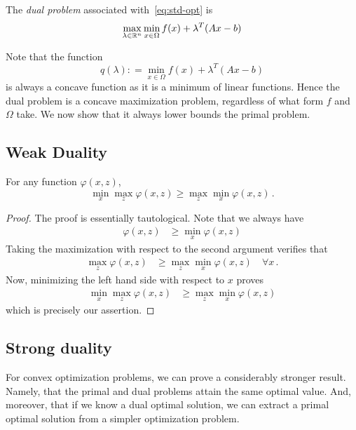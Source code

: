 \documentclass[12pt]{article}
\begin{document}
 The \emph{dual problem} associated with~\eqref{eq:std-opt} is
 \[
 \max_{\lambda \in \mathbb{R}^n} \min_{x \in \Omega} f(x) + \lambda^T(Ax-b)
\]

Note that the function
\[
	q(\lambda): =  \min_{x \in \Omega} f(x) + \lambda^T(Ax-b)
\]
is always a concave function as it is a minimum of linear functions.  Hence the dual problem is a concave maximization problem, regardless of what form $f$ and $\Omega$ take.  We now show that it always lower bounds the primal problem. 

\subsection{Weak Duality}
  
\begin{proposition}
For any function $\varphi(x,z)$,
\[
 \min_x \max_z \varphi(x,z) \geq \max_z \min_x \varphi(x,z)\,.
 \]
\end{proposition}
\begin{proof}
The proof is essentially tautological.  Note that we always have
\begin{align*}
\varphi(x,z) &\geq \min_x \varphi(x,z)
\end{align*}
Taking the maximization with respect to the second argument verifies that
\begin{align*}
\max_z \varphi(x,z) &\geq \max_z \min_x \varphi(x,z) \quad \forall x\,.
\end{align*}
Now, minimizing the left hand side with respect to $x$ proves
\begin{align*}
\min_x \max_z\varphi(x,z) &\geq \max_z \min_x \varphi(x,z)
\end{align*}
which is precisely our assertion.
\end{proof}

\subsection{Strong duality}

For convex optimization problems, we can prove a considerably stronger result.  Namely, that the primal and dual problems attain the same optimal value.  And, moreover, that if we know a dual optimal solution, we can extract a primal optimal solution from a simpler optimization problem.
\end{document}
